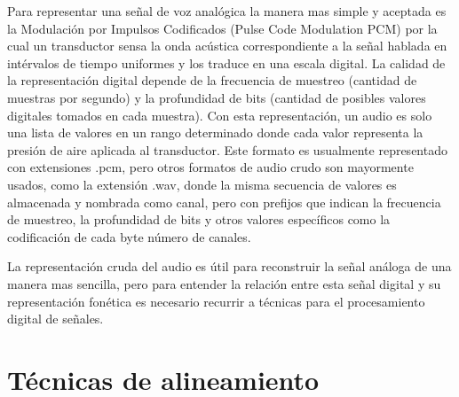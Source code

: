 Para representar una señal de voz analógica la manera mas simple y aceptada es la Modulación por Impulsos Codificados (Pulse Code Modulation PCM) por la cual un transductor sensa la onda acústica correspondiente a la señal hablada en intérvalos de tiempo uniformes y los traduce en una escala digital. La calidad de la representación digital depende de la frecuencia de muestreo (cantidad de muestras por segundo) y la profundidad de bits (cantidad de posibles valores digitales tomados en cada muestra). Con esta representación, un audio es solo una lista de valores en un rango determinado donde cada valor representa la presión de aire aplicada al transductor. Este formato es usualmente representado con extensiones .pcm, pero otros formatos de audio crudo son mayormente usados, como la extensión .wav, donde la misma secuencia de valores es almacenada y nombrada como canal, pero con prefijos que indican la frecuencia de muestreo, la profundidad de bits y otros valores específicos como la codificación de cada byte número de canales.

La representación cruda del audio es útil para reconstruir la señal análoga de una manera mas sencilla, pero para entender la relación entre esta señal digital y su representación fonética es necesario recurrir a técnicas para el procesamiento digital de señales.

\section{Técnicas de alineamiento}

